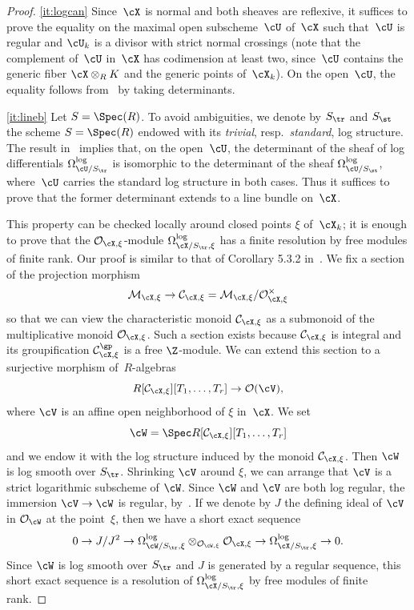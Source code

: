 \skpt
\begin{proof}
\eqref{it:logcan} Since~$\cX$ is normal and both sheaves are reflexive, it suffices to prove the equality on the maximal open subscheme~$\cU$ of~$\cX$ such that~$\cU$ is regular and $\cU_k$ is a divisor with strict normal crossings (note that the complement of~$\cU$ in~$\cX$ has codimension at least two, since~$\cU$ contains the generic fiber $\cX\otimes_R K$ and the generic points of~$\cX_k$). On the open~$\cU$, the equality follows from~\cite[5.3.4]{kato-saito} by taking determinants.

\eqref{it:lineb}
Let $S=\Spec(R)$.
To avoid ambiguities, we denote by $S_{\tr}$ and $S_{\st}$ the scheme $S=\Spec(R)$ endowed with its {\em trivial}, resp.~{\em standard}, log structure.
The result in~\cite[5.3.4]{kato-saito} implies that, on the open~$\cU$, the determinant of the sheaf of log differentials $\Omega^{\log}_{\cU/S_{\tr}}$ is isomorphic to the determinant of the sheaf $\Omega^{\log}_{\cU/S_{\st}}$, where~$\cU$ carries the standard log structure in both cases. Thus it suffices to prove that the former determinant extends to a line bundle on~$\cX$.

This property can be checked locally around closed points $\xi$ of~$\cX_k$;
it is enough to prove that the $\mathcal{O}_{\cX,\xi}$-module $\Omega^{\log}_{\cX/S_{\tr},\xi}$ has a finite resolution by free modules of finite rank. Our proof is similar to that of Corollary 5.3.2 in~\cite{kato-saito}.
We fix a section of the projection morphism
\[
\mathcal{M}_{\cX,\xi}\to \mathcal{C}_{\cX,\xi}=\mathcal{M}_{\cX,\xi}/\mathcal{O}^{\times}_{\cX,\xi}
\]
so that we can view the characteristic monoid $\mathcal{C}_{\cX,\xi}$ as a submonoid of the multiplicative monoid $\mathcal{O}_{\cX,\xi}$. Such a section exists because $\mathcal{C}_{\cX,\xi}$ is integral and its groupification $\mathcal{C}^{\gp}_{\cX,\xi}$ is a free $\Z$-module. We can extend this section to a surjective morphism of~$R$\nobreakdash-algebras
\[
R[\mathcal{C}_{\cX,\xi}][T_1,\ldots,T_r]\to \mathcal{O}(\cV),
\]
where $\cV$ is an affine open neighborhood of $\xi$ in~$\cX$.
We set
\[
\cW=\Spec R[\mathcal{C}_{\cX,\xi}][T_1,\ldots,T_r]
\]
and we endow it with the log structure induced by the monoid $\mathcal{C}_{\cX,\xi}$.
Then $\cW$ is log smooth over $S_{\tr}$. Shrinking $\cV$ around $\xi$, we can arrange that $\cV$ is a strict logarithmic subscheme of $\cW$.
Since $\cW$ and $\cV$ are both log regular, the immersion $\cV\to \cW$ is regular, by~\cite[4.2]{kato}. If we denote by $J$ the defining ideal of $\cV$ in $\mathcal{O}_{\cW}$ at the point~$\xi$, then we have a short exact sequence
\begin{equation}\label{eq:res}
0\to J/J^2 \to \Omega^{\log}_{\cW/S_{\tr},\xi}\otimes_{\mathcal{O}_{\cW,\xi} } \mathcal{O}_{\cX,\xi}\to \Omega^{\log}_{\cX/S_{\tr},\xi} \to 0.
\end{equation}
Since $\cW$ is log smooth over $S_{\tr}$ and $J$ is generated by a regular sequence, this short exact sequence is a resolution of $\Omega^{\log}_{\cX/S_{\tr},\xi}$ by free modules of finite rank.


\end{proof}
